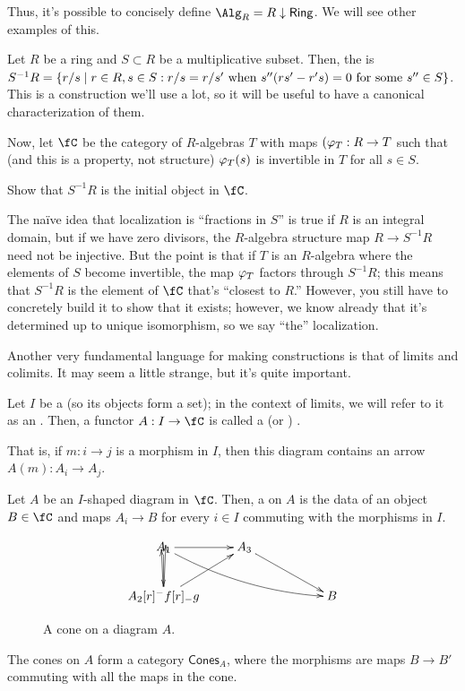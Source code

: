 Thus, it's possible to concisely define \(\Alg_R = R\downarrow\mathsf{Ring}\). We will see other examples of this.
\begin{exm}[Localization]
Let \(R\) be a ring and \(S\subset R\) be a multiplicative subset. Then, the  is
\(S^{-1}R = \qty{ r/s\mid r\in R, s\in S: r/s = r/s'\text{ when } s''(rs' - r's) = 0\text{ for some } s''\in S }\).
This is a construction we'll use a lot, so it will be useful to have a canonical characterization of them.

Now, let \(\fC\) be the category of \(R\)-algebras \(T\) with maps \((\varphi_T:R\to T\) such that (and this is
a property, not structure) \(\varphi_T(s)\) is invertible in \(T\) for all \(s\in S\).
\begin{ex}
Show that \(S^{-1}R\) is the initial object in \(\fC\).
\end{ex}
The naïve idea that localization is ``fractions in \(S\)'' is true if \(R\) is an integral domain, but if
we have zero divisors, the \(R\)-algebra structure map \(R\to S^{-1}R\) need not be injective. But the point is
that if \(T\) is an \(R\)-algebra where the elements of \(S\) become invertible, the map \(\varphi_T\) factors through
\(S^{-1}R\); this means that \(S^{-1}R\) is the element of \(\fC\) that's ``closest to \(R\).'' However, you still
have to concretely build it to show that it exists; however, we know already that it's determined up to unique
isomorphism, so we say ``the'' localization.
\end{exm}
Another very fundamental language for making constructions is that of limits and colimits. It may seem a little
strange, but it's quite important.
\begin{defn}
Let \(I\) be a  (so its objects form a set); in the context of limits, we will refer to it as
an . Then, a functor \(A:I\to\fC\) is called a  (or )
.
\end{defn}
That is, if \(m:i\to j\) is a morphism in \(I\), then this diagram contains an arrow \(A(m): A_i\to A_j\).
\begin{defn}
Let \(A\) be an \(I\)-shaped diagram in \(\fC\). Then, a  on \(A\) is the data of an object \(B\in\fC\)
and maps \(A_i\to B\) for every \(i\in I\) commuting with the morphisms in \(I\).
\begin{figure}[h!]
\[\xymatrix{
	A_1\ar[r]\ar[d]\ar@/_0.3cm/[drrr] & A_3\ar[drr]\\
	A_2\ar[ur]\dblarrow[r][f][g] &&& B
}\]
\caption{A cone on a diagram \(A\).}
\end{figure}
The cones on \(A\) form a category \(\mathsf{Cones}_A\), where the morphisms are maps \(B\to B'\) commuting with
all the maps in the cone.
\end{defn}
